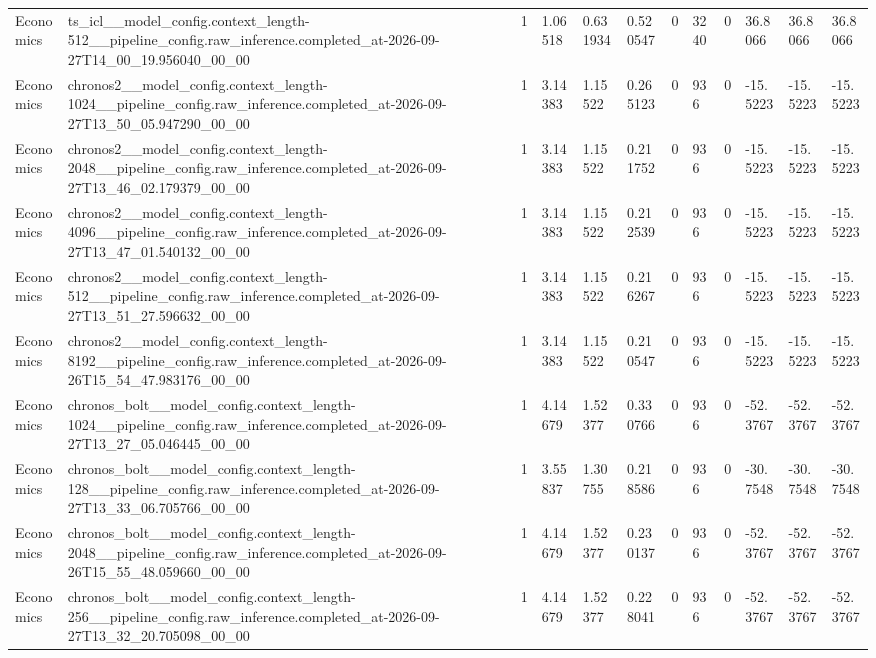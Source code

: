 \begin{tabular}{llllllllllll}
Economics & ts\_icl\_\_model\_config.context\_length-512\_\_pipeline\_config.raw\_inference.completed\_at-2026-09-27T14\_00\_19.956040\_00\_00 & 1 & 1.06518 & 0.631934 & 0.520547 & 0 & 3240 & 0 & 36.8066 & 36.8066 & 36.8066 \\
Economics & chronos2\_\_model\_config.context\_length-1024\_\_pipeline\_config.raw\_inference.completed\_at-2026-09-27T13\_50\_05.947290\_00\_00 & 1 & 3.14383 & 1.15522 & 0.265123 & 0 & 936 & 0 & -15.5223 & -15.5223 & -15.5223 \\
Economics & chronos2\_\_model\_config.context\_length-2048\_\_pipeline\_config.raw\_inference.completed\_at-2026-09-27T13\_46\_02.179379\_00\_00 & 1 & 3.14383 & 1.15522 & 0.211752 & 0 & 936 & 0 & -15.5223 & -15.5223 & -15.5223 \\
Economics & chronos2\_\_model\_config.context\_length-4096\_\_pipeline\_config.raw\_inference.completed\_at-2026-09-27T13\_47\_01.540132\_00\_00 & 1 & 3.14383 & 1.15522 & 0.212539 & 0 & 936 & 0 & -15.5223 & -15.5223 & -15.5223 \\
Economics & chronos2\_\_model\_config.context\_length-512\_\_pipeline\_config.raw\_inference.completed\_at-2026-09-27T13\_51\_27.596632\_00\_00 & 1 & 3.14383 & 1.15522 & 0.216267 & 0 & 936 & 0 & -15.5223 & -15.5223 & -15.5223 \\
Economics & chronos2\_\_model\_config.context\_length-8192\_\_pipeline\_config.raw\_inference.completed\_at-2026-09-26T15\_54\_47.983176\_00\_00 & 1 & 3.14383 & 1.15522 & 0.210547 & 0 & 936 & 0 & -15.5223 & -15.5223 & -15.5223 \\
Economics & chronos\_bolt\_\_model\_config.context\_length-1024\_\_pipeline\_config.raw\_inference.completed\_at-2026-09-27T13\_27\_05.046445\_00\_00 & 1 & 4.14679 & 1.52377 & 0.330766 & 0 & 936 & 0 & -52.3767 & -52.3767 & -52.3767 \\
Economics & chronos\_bolt\_\_model\_config.context\_length-128\_\_pipeline\_config.raw\_inference.completed\_at-2026-09-27T13\_33\_06.705766\_00\_00 & 1 & 3.55837 & 1.30755 & 0.218586 & 0 & 936 & 0 & -30.7548 & -30.7548 & -30.7548 \\
Economics & chronos\_bolt\_\_model\_config.context\_length-2048\_\_pipeline\_config.raw\_inference.completed\_at-2026-09-26T15\_55\_48.059660\_00\_00 & 1 & 4.14679 & 1.52377 & 0.230137 & 0 & 936 & 0 & -52.3767 & -52.3767 & -52.3767 \\
Economics & chronos\_bolt\_\_model\_config.context\_length-256\_\_pipeline\_config.raw\_inference.completed\_at-2026-09-27T13\_32\_20.705098\_00\_00 & 1 & 4.14679 & 1.52377 & 0.228041 & 0 & 936 & 0 & -52.3767 & -52.3767 & -52.3767 \\

\end{tabular}
